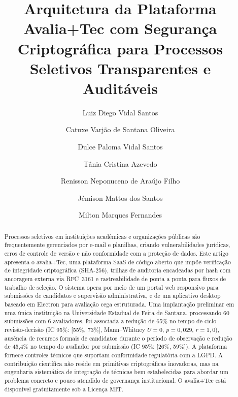 \documentclass[preprint,12pt,a4paper]{elsarticle}
\begin{document}
\renewcommand{\labelenumii}{\arabic{enumi}.\arabic{enumii}}

\begin{frontmatter}

\title{Arquitetura da Plataforma Avalia+Tec com Segurança Criptográfica para Processos Seletivos Transparentes e Auditáveis}

\author[label1]{Luiz Diego Vidal Santos}
\author[label2]{Catuxe Varjão de Santana Oliveira}
\author[label4]{Dulce Paloma Vidal Santos}
\author[label1]{Tânia Cristina Azevedo}
\author[label3]{Renisson Neponuceno de Araújo Filho}
\author[label5]{Jémison Mattos dos Santos}
\author[label6]{Milton Marques Fernandes}

\address[label1]{Universidade Estadual de Feira de Santana, Departamento de Ciências Exatas, Feira de Santana, Brasil}
\address[label2]{Universidade Federal de Sergipe, Programa de Pós-Graduação em Ciência da Propriedade Intelectual, São Cristóvão, Brasil}
\address[label3]{Universidade Federal Rural de Pernambuco, Departamento de Engenharia Rural, Recife, Brasil}
\address[label4]{Universidade Tiradentes, Departamento de Direito, Aracaju, Brasil}
\address[label5]{Universidade Estadual de Santa Cruz, Ilhéus, Brasil}
\address[label6]{Universidade Federal de Sergipe, Departamento de Ciências Florestais, São Cristóvão, Brasil}


\begin{abstract}
Processos seletivos em instituições acadêmicas e organizações públicas são frequentemente gerenciados por e-mail e planilhas, criando vulnerabilidades jurídicas, erros de controle de versão e não conformidade com a proteção de dados. Este artigo apresenta o avalia+Tec, uma plataforma SaaS de código aberto que impõe verificação de integridade criptográfica (SHA-256), trilhas de auditoria encadeadas por hash com ancoragem externa via RFC~3161 e rastreabilidade de ponta a ponta para fluxos de trabalho de seleção. O sistema opera por meio de um portal web responsivo para submissões de candidatos e supervisão administrativa, e de um aplicativo desktop baseado em Electron para avaliação cega estruturada. Uma implantação preliminar em uma única instituição na Universidade Estadual de Feira de Santana, processando 60 submissões com 6 avaliadores, foi associada a redução de 65\% no tempo de ciclo revisão-decisão (IC 95\%: [55\%, 73\%], Mann--Whitney $U = 0$, $p = 0{,}029$, $r = 1{,}0$), ausência de recursos formais de candidatos durante o período de observação e redução de 45,4\% no tempo do avaliador por submissão (IC 95\%: [26\%, 59\%]). A plataforma fornece controles técnicos que suportam conformidade regulatória com a LGPD. A contribuição científica não reside em primitivas criptográficas inovadoras, mas na engenharia sistemática de integração de técnicas bem estabelecidas para abordar um problema concreto e pouco atendido de governança institucional. O avalia+Tec está disponível gratuitamente sob a Licença MIT.
\end{abstract}


\end{frontmatter}
\end{document}
